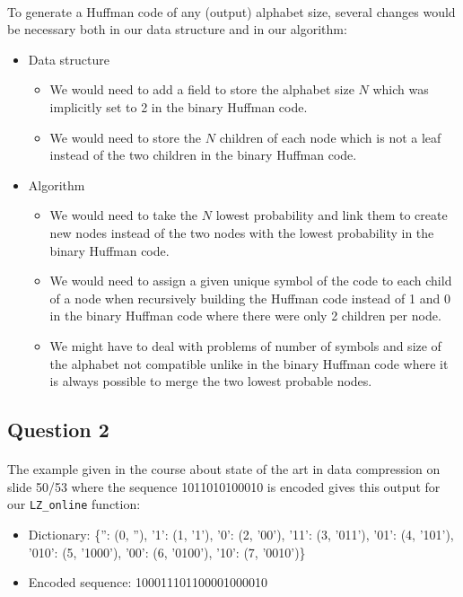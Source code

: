 \documentclass[a4paper, 11pt, oneside]{article}
\begin{document}
\paragraph{}To generate a Huffman code of any (output) alphabet size, several changes would be necessary both in our data structure and in our algorithm:
\begin{itemize}
    \item Data structure
        \begin{itemize}
            \item We would need to add a field to store the alphabet size $N$ which was implicitly set to 2 in the binary Huffman code.
            \item We would need to store the $N$ children of each node which is not a leaf instead of the two children in the binary Huffman code.
        \end{itemize}
    \item Algorithm
        \begin{itemize}
            \item We would need to take the $N$ lowest probability and link them to create new nodes instead of the two nodes with the lowest probability in the binary Huffman code.
            \item We would need to assign a given unique symbol of the code to each child of a node when recursively building the Huffman code instead of 1 and 0 in the binary Huffman code where there were only 2 children per node.
            \item We might have to deal with problems of number of symbols and size of the alphabet not compatible unlike in the binary Huffman code where it is always possible to merge the two lowest probable nodes. 
        \end{itemize}
\end{itemize}

\subsection{Question 2}

\paragraph{}The example given in the course about state of the art in data compression on slide 50/53 where the sequence 1011010100010 is encoded gives this output for our \texttt{LZ\_online} function:
\begin{itemize}
    \item Dictionary: \{'': (0, ''), '1': (1, '1'), '0': (2, '00'), '11': (3, '011'), '01': (4, '101'), '010': (5, '1000'), '00': (6, '0100'), '10': (7, '0010')\}
    \item Encoded sequence: 100011101100001000010
\end{itemize}
\end{document}
